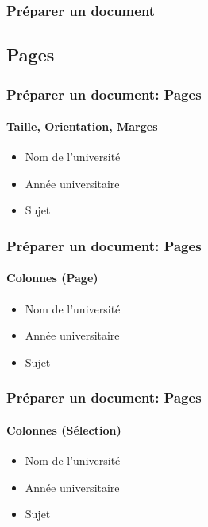 \documentclass[xcolor=table]{beamer}
\begin{document}
\begin{frame}
\frametitle{Préparer un document}

\end{frame}

\subsection{Pages}

\begin{frame}[t]
\frametitle{Préparer un document: Pages}
\framesubtitle{Taille, Orientation, Marges}

\begin{minipage}{0.38\textwidth}
	\begin{itemize}
		\item Nom de l'université 
		\item Année universitaire
		\item Sujet
	\end{itemize}
\end{minipage}
\begin{minipage}{0.6\textwidth}
\end{minipage}

\end{frame}

\begin{frame}[t]
\frametitle{Préparer un document: Pages}
\framesubtitle{Colonnes (Page)}

\begin{minipage}{0.38\textwidth}
\begin{itemize}
\item Nom de l'université 
\item Année universitaire
\item Sujet
\end{itemize}
\end{minipage}
\begin{minipage}{0.6\textwidth}
\end{minipage}

\end{frame}

\begin{frame}[t]
\frametitle{Préparer un document: Pages}
\framesubtitle{Colonnes (Sélection)}

\begin{minipage}{0.38\textwidth}
	\begin{itemize}
		\item Nom de l'université 
		\item Année universitaire
		\item Sujet
	\end{itemize}
\end{minipage}
\begin{minipage}{0.6\textwidth}
\end{minipage}

\end{frame}
\end{document}
